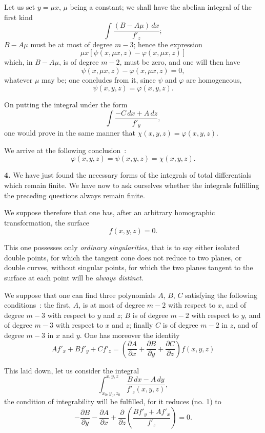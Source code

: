 \documentclass{article}
\begin{document}
Let us set $y = \mu x$, $\mu$ being a constant; we shall have the abelian integral of the first kind
\[
\int \frac{(B - A\mu)\,dx}{f'_{z}};
\]
$B - A\mu$ must be at most of degree $m - 3$; hence the expression
\[
\mu x[\psi(x, \mu x, z) - \varphi(x, \mu x, z)]
\]
which, in $B - A\mu$, is of degree $m - 2$, must be zero, and one will then have
\[
\psi(x, \mu x, z) - \varphi(x, \mu x, z) = 0,
\]
whatever $\mu$ may be; one concludes from it, since $\psi$ and $\varphi$ are homogeneous,
\[
\psi(x, y, z) = \varphi(x, y, z).
\]

On putting the integral under the form
\[
\int \frac{-C\,dx + A\,dz}{f'_{y}},
\]
one would prove in the same manner that $\chi(x, y, z) = \varphi(x, y, z)$.

We arrive at the following conclusion~:
\[
\varphi(x, y, z) = \psi(x, y, z) = \chi(x, y, z).
\]

\textbf{4.} We have just found the necessary forms of the integrals of total differentials which remain finite. We have now to ask ourselves whether the integrals fulfilling the preceding questions always remain finite.


We suppose therefore that one has, after an arbitrary homographic transformation, the surface
\[
f(x, y, z) = 0.
\]

This one possesses only \emph{ordinary singularities}, that is to say either isolated double points, for which the tangent cone does not reduce to two planes, or double curves, without singular points, for which the two planes tangent to the surface at each point will be \emph{always distinct}.

We suppose that one can find three polynomials $A$, $B$, $C$ satisfying the following conditions~: the first, $A$, is at most of degree $m - 2$ with respect to $x$, and of degree $m - 3$ with respect to $y$ and $z$; $B$ is of degree $m - 2$ with respect to $y$, and of degree $m - 3$ with respect to $x$ and $z$; finally $C$ is of degree $m - 2$ in $z$, and of degree $m - 3$ in $x$ and $y$. One has moreover the identity
\[
A f'_{x} + B f'_{y} + C f'_{z} = \left( \frac{\partial A}{\partial x} + \frac{\partial B}{\partial y} + \frac{\partial C}{\partial z} \right) f(x, y, z)
\tag{2}
\]

This laid down, let us consider the integral
\[
\int_{x_{0}, y_{0}, z_{0}}^{x, y, z} \frac{B\,dx - A\,dy}{f'_{z}(x, y, z)},
\]
the condition of integrability will be fulfilled, for it reduces (no. 1) to
\[
- \frac{\partial B}{\partial y} - \frac{\partial A}{\partial x} + \frac{\partial}{\partial z} \left( \frac{B f'_{y} + A f'_{x}}{f'_{z}} \right) = 0.
\]
\end{document}
